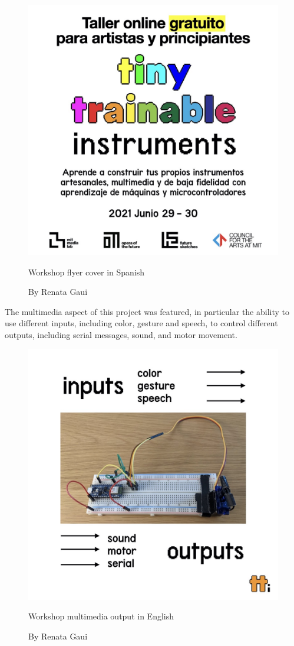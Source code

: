\begin{figure}[ht]
  \centering
  \includegraphics[width=0.75\linewidth,height=0.35\textheight,keepaspectratio]{images/workshop-es-1.jpg}
  \caption{Workshop flyer cover in Spanish}
  \caption*{By Renata Gaui}
  \label{fig:workshop-spanish-flyer-page-1}
\end{figure}

The multimedia aspect of this project was featured, in particular the ability to use different inputs, including color, gesture and speech, to control different outputs, including serial messages, sound, and motor movement.

\begin{figure}[ht]
  \centering
  \includegraphics[width=0.75\linewidth,height=0.35\textheight,keepaspectratio]{images/workshop-en-2.jpg}
  \caption{Workshop multimedia output in English}
  \caption*{By Renata Gaui}
  \label{fig:workshop-english-flyer-page-2}
\end{figure}

